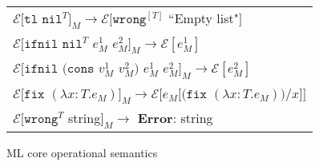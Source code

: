 \begin{figure}[ph!]
\begin{tabular}{l}
$\mathscr{E}[\mathtt{tl}$ $\mathtt{nil}^{T}]_{M}\rightarrow\mathscr{E}[\mathtt{wrong}^{[T]}$ ``Empty list"$]$ \\

\vspace{5pt}

$\mathscr{E}[\mathtt{ifnil}$ $\mathtt{nil}^{T}$ $e_{M}^{1}$ $e_{M}^{2}]_{M}\rightarrow\mathscr{E}[e_{M}^{1}]$ \\

\vspace{5pt}

$\mathscr{E}[\mathtt{ifnil}$ $(\mathtt{cons}$ $v_{M}^{1}$ $v_{M}^{2})$ $e_{M}^{1}$ $e_{M}^{2}]_{M}\rightarrow\mathscr{E}[e_{M}^{2}]$ \\

\vspace{5pt}

$\mathscr{E}[\mathtt{fix}$ $(\lambda x:T.e_{M})]_{M}\rightarrow\mathscr{E}[e_{M}[(\mathtt{fix}$ $(\lambda x:T.e_{M}))/x]]$ \\

\vspace{5pt}

$\mathscr{E}[\mathtt{wrong}^{T}$ string$]_{M}\rightarrow$ \textbf{Error}: string 
\end{tabular}
\caption{ML core operational semantics}
\label{mcos}
\end{figure}